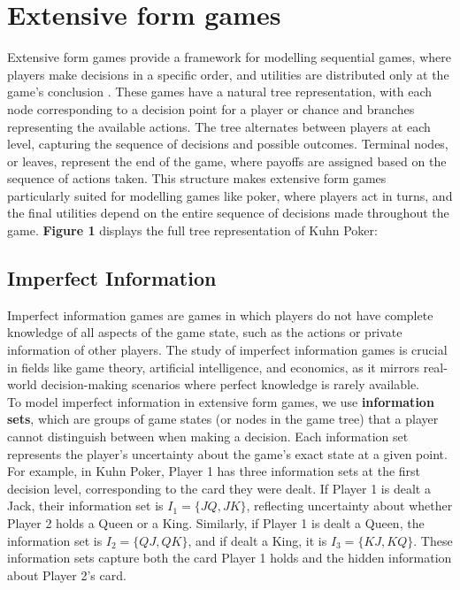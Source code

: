 \documentclass{article}
\begin{document}
\section{Extensive form games}

Extensive form games provide a framework for modelling sequential games, where players make decisions in a specific order, and utilities are distributed only at the game's conclusion \cite{Int8}. These games have a natural tree representation, with each node corresponding to a decision point for a player or chance and branches representing the available actions. The tree alternates between players at each level, capturing the sequence of decisions and possible outcomes. Terminal nodes, or leaves, represent the end of the game, where payoffs are assigned based on the sequence of actions taken. This structure makes extensive form games particularly suited for modelling games like poker, where players act in turns, and the final utilities depend on the entire sequence of decisions made throughout the game. \textbf{Figure 1} displays the full tree representation of Kuhn Poker:



\subsection{Imperfect Information}
Imperfect information games are games in which players do not have complete knowledge of all aspects of the game state, such as the actions or private information of other players. The study of imperfect information games is crucial in fields like game theory, artificial intelligence, and economics, as it mirrors real-world decision-making scenarios where perfect knowledge is rarely available.\\

To model imperfect information in extensive form games, we use \textbf{information sets}, which are groups of game states (or nodes in the game tree) that a player cannot distinguish between when making a decision. Each information set represents the player's uncertainty about the game's exact state at a given point. For example, in Kuhn Poker, Player 1 has three information sets at the first decision level, corresponding to the card they were dealt. If Player 1 is dealt a Jack, their information set is \( I_1 = \{JQ, JK\} \), reflecting uncertainty about whether Player 2 holds a Queen or a King. Similarly, if Player 1 is dealt a Queen, the information set is \( I_2 = \{QJ, QK\} \), and if dealt a King, it is \( I_3 = \{KJ, KQ\} \). These information sets capture both the card Player 1 holds and the hidden information about Player 2’s card.
\end{document}
